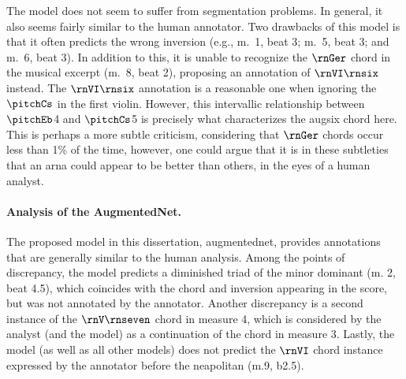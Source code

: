 The \textcite{mcleod2021modular} model does not seem to
suffer from segmentation problems. In general, it also seems
fairly similar to the human annotator. Two drawbacks of this
model is that it often predicts the wrong inversion (e.g.,
m.~1, beat 3; m.~5, beat 3; and m.~6, beat 3). In addition
to this, it is unable to recognize the $\rnGer$ chord in the
musical excerpt (m.~8, beat 2), proposing an annotation of
$\rnVI\rnsix$ instead. The $\rnVI\rnsix$ annotation is a
reasonable one when ignoring the $\pitchCs$ in the first
violin. However, this intervallic relationship between
$\pitchEb$4 and $\pitchCs$5 is precisely what characterizes
the \gls{augsix} chord here. This is perhaps a more subtle
criticism, considering that $\rnGer$ chords occur less than
1\% of the time, however, one could argue that it is in
these subtleties that an \gls{arna} could appear to be
better than others, in the eyes of a human analyst.

\paragraph{Analysis of the AugmentedNet.}

The proposed model in this dissertation, \gls{augmentednet},
provides annotations that are generally similar to the human
analysis. Among the points of discrepancy, the model
predicts a diminished triad of the minor dominant (m. 2,
beat 4.5), which coincides with the chord and inversion
appearing in the score, but was not annotated by the
annotator. Another discrepancy is a second instance of the
$\rnV\rnseven$ chord in measure 4, which is considered by
the analyst (and the \textcite{mcleod2021modular} model) as
a continuation of the chord in measure 3. Lastly, the model
(as well as all other models) does not predict the $\rnVI$
chord instance expressed by the annotator before the
\gls{neapolitan} (m.9, b2.5).

